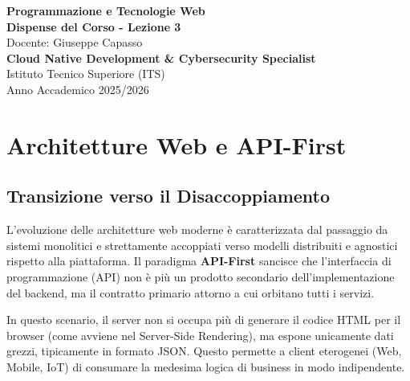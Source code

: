 \documentclass[11pt,a4paper]{report}
\begin{document}
\begin{titlepage}
    \centering
    \vspace*{4cm}
    {\Huge \textbf{\color{primary} Programmazione e Tecnologie Web}} \\[1.5cm]
    {\Large \textbf{Dispense del Corso - Lezione 3}} \\[0.5cm]
    {\large Docente: Giuseppe Capasso} \\[1.5cm]
    {\normalsize \textbf{Cloud Native Development \& Cybersecurity Specialist}} \\
    {\normalsize Istituto Tecnico Superiore (ITS)} \\
    \vfill
    {\normalsize Anno Accademico 2025/2026}
\end{titlepage}

\newpage
\tableofcontents
\newpage

\chapter{Architetture Web e API-First}

\section{Transizione verso il Disaccoppiamento}
L'evoluzione delle architetture web moderne è caratterizzata dal passaggio da sistemi monolitici e strettamente accoppiati verso modelli distribuiti e agnostici rispetto alla piattaforma. Il paradigma \textbf{API-First} sancisce che l'interfaccia di programmazione (API) non è più un prodotto secondario dell'implementazione del backend, ma il contratto primario attorno a cui orbitano tutti i servizi.

In questo scenario, il server non si occupa più di generare il codice HTML per il browser (come avviene nel Server-Side Rendering), ma espone unicamente dati grezzi, tipicamente in formato JSON. Questo permette a client eterogenei (Web, Mobile, IoT) di consumare la medesima logica di business in modo indipendente.
\end{document}
